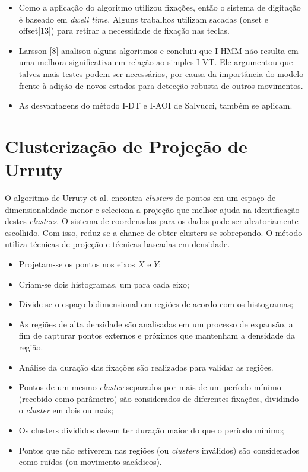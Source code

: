 \documentclass[brazil,]{report}
\begin{document}
\begin{itemize}
\itemsep1pt\parskip0pt
\item
  Como a aplicação do algoritmo utilizou fixações, então o sistema de
  digitação é baseado em \emph{dwell time}. Alguns trabalhos utilizam
  sacadas (onset e offset{[}13{]}) para retirar a necessidade de fixação
  nas teclas.
\item
  Larsson {[}8{]} analisou alguns algoritmos e concluiu que \gls{I-HMM}
  não resulta em uma melhora significativa em relação ao simples
  \gls{I-VT}. Ele argumentou que talvez mais testes podem ser
  necessários, por causa da importância do modelo frente à adição de
  novos estados para detecção robusta de outros movimentos.
\item
  As desvantagens do método I-DT e I-AOI de Salvucci, também se aplicam.
\end{itemize}

\section{Clusterização de Projeção de
Urruty}\label{clusterizauxe7uxe3o-de-projeuxe7uxe3o-de-urruty}

O algoritmo de Urruty et al. encontra \emph{clusters} de pontos em um
espaço de dimensionalidade menor e seleciona a projeção que melhor ajuda
na identificação destes \emph{clusters}. O sistema de coordenadas para
os dados pode ser aleatoriamente escolhido. Com isso, reduz-se a chance
de obter clusters se sobrepondo. O método utiliza técnicas de projeção e
técnicas baseadas em densidade.

\begin{itemize}
\itemsep1pt\parskip0pt
\item
  Projetam-se os pontos nos eixos $X$ e $Y$;
\item
  Criam-se dois histogramas, um para cada eixo;
\item
  Divide-se o espaço bidimensional em regiões de acordo com os
  histogramas;
\item
  As regiões de alta densidade são analisadas em um processo de
  expansão, a fim de capturar pontos externos e próximos que mantenham a
  densidade da região.
\item
  Análise da duração das fixações são realizadas para validar as
  regiões.
\item
  Pontos de um mesmo \emph{cluster} separados por mais de um período
  mínimo (recebido como parâmetro) são considerados de diferentes
  fixações, dividindo o \emph{cluster} em dois ou mais;
\item
  Os clusters divididos devem ter duração maior do que o período mínimo;
\item
  Pontos que não estiverem nas regiões (ou \emph{clusters} inválidos)
  são considerados como ruídos (ou movimento sacádicos).
\end{itemize}
\end{document}
